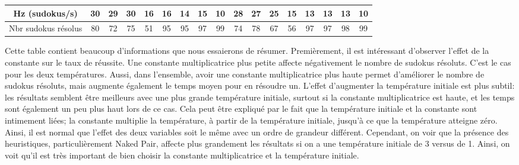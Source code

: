 \documentclass[8pt]{article}
\begin{document}
\begin{table}[h]
\begin{tabular}{|c|cccccccc|cccccccc|}
		Hz (sudokus/s)      & \multicolumn{1}{c|}{\cellcolor[HTML]{F7DFDF}30}   & \multicolumn{1}{c|}{\cellcolor[HTML]{F7DFDF}29}    & \multicolumn{1}{c|}{\cellcolor[HTML]{F7DFDF}30}   & \multicolumn{1}{c|}{\cellcolor[HTML]{F7DFDF}16}    & \multicolumn{1}{c|}{\cellcolor[HTML]{FFEBEB}16}  & \multicolumn{1}{c|}{\cellcolor[HTML]{FFEBEB}14}  & \multicolumn{1}{c|}{\cellcolor[HTML]{FFEBEB}15}  & \cellcolor[HTML]{FFEBEB}10  & \multicolumn{1}{c|}{\cellcolor[HTML]{BBE0E9}28} & \multicolumn{1}{c|}{\cellcolor[HTML]{BBE0E9}27} & \multicolumn{1}{c|}{\cellcolor[HTML]{BBE0E9}25} & \multicolumn{1}{c|}{\cellcolor[HTML]{BBE0E9}15} & \multicolumn{1}{c|}{\cellcolor[HTML]{D6F7FF}13}  & \multicolumn{1}{c|}{\cellcolor[HTML]{D6F7FF}13}  & \multicolumn{1}{c|}{\cellcolor[HTML]{D6F7FF}13}  & \cellcolor[HTML]{D6F7FF}10  \\ \hline
		Nbr sudokus résolus & \multicolumn{1}{c|}{\cellcolor[HTML]{F7DFDF}80}   & \multicolumn{1}{c|}{\cellcolor[HTML]{F7DFDF}72}    & \multicolumn{1}{c|}{\cellcolor[HTML]{F7DFDF}75}   & \multicolumn{1}{c|}{\cellcolor[HTML]{F7DFDF}51}    & \multicolumn{1}{c|}{\cellcolor[HTML]{FFEBEB}95}  & \multicolumn{1}{c|}{\cellcolor[HTML]{FFEBEB}95}  & \multicolumn{1}{c|}{\cellcolor[HTML]{FFEBEB}97}  & \cellcolor[HTML]{FFEBEB}99  & \multicolumn{1}{c|}{\cellcolor[HTML]{BBE0E9}74} & \multicolumn{1}{c|}{\cellcolor[HTML]{BBE0E9}78} & \multicolumn{1}{c|}{\cellcolor[HTML]{BBE0E9}67} & \multicolumn{1}{c|}{\cellcolor[HTML]{BBE0E9}56} & \multicolumn{1}{c|}{\cellcolor[HTML]{D6F7FF}97}  & \multicolumn{1}{c|}{\cellcolor[HTML]{D6F7FF}97}  & \multicolumn{1}{c|}{\cellcolor[HTML]{D6F7FF}98}  & \cellcolor[HTML]{D6F7FF}99  \\ \hline
	\end{tabular}
\end{table}
\vspace{-12pt}

Cette table contient beaucoup d'informations que nous essaierons de résumer.
Premièrement, il est intéressant d'observer l'effet de la constante sur le taux
de réussite. Une constante multiplicatrice plus petite affecte négativement le
nombre de sudokus résoluts. C'est le cas pour les deux températures. Aussi,
dans l'ensemble, avoir une constante multiplicatrice plus haute
permet d'améliorer le nombre de sudokus résoluts, mais augmente également
le temps moyen pour en résoudre un. L'effet d'augmenter la température initiale
est plus subtil: les résultats semblent être meilleurs avec une plus grande
température initiale, surtout si la constante multiplicatrice est haute, et
les temps sont également un peu plus haut lors de ce cas. Cela peut être expliqué
par le fait que la température initiale et la constante sont intimement liées;
la constante multiplie la température, à partir de la température initiale, jusqu'à
ce que la température atteigne zéro. Ainsi, il est normal que l'effet des deux variables soit le même avec un ordre de grandeur différent. Cependant, on voir que
la présence des heuristiques, particulièrement Naked Pair, affecte plus grandement
les résultats si on a une température initiale de 3 versus de 1. Ainsi, on
voit qu'il est très important de bien choisir la constante multiplicatrice et
la température initiale.
\end{document}

